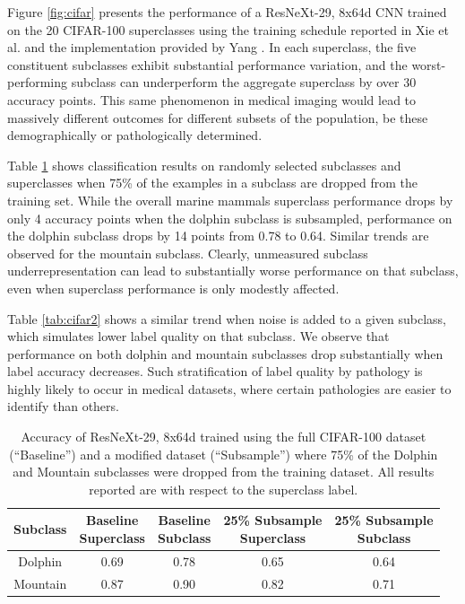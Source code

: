 \documentclass{article}
\begin{document}
 Figure \ref{fig:cifar} presents the performance of a ResNeXt-29, 8x64d CNN trained on the 20 CIFAR-100 superclasses using the training schedule reported in Xie et al. \citep{Xie2016-ip} and the implementation provided by Yang \citep{Yang_undated-bt}.  
In each superclass, the five constituent subclasses exhibit substantial performance variation, and the worst-performing subclass can underperform the aggregate superclass by over 30 accuracy points.  
This same phenomenon in medical imaging would lead to massively different outcomes for different subsets of the population, be these demographically or pathologically determined. 

 Table \ref{tab:cifar1} shows classification results on randomly selected subclasses and superclasses when 75\% of the examples in a subclass are dropped from the training set.  
 While the overall marine mammals superclass performance drops by only 4 accuracy points when the dolphin subclass is subsampled, performance on the dolphin subclass drops by 14 points from 0.78 to 0.64.  
 Similar trends are observed for the mountain subclass.  
 Clearly, unmeasured subclass underrepresentation can lead to substantially worse performance on that subclass, even when superclass performance is only modestly affected.
 
Table \ref{tab:cifar2} shows a similar trend when noise is added to a given subclass, which simulates lower label quality on that subclass.  We observe that performance on both dolphin and mountain subclasses drop substantially when label accuracy decreases.  
Such stratification of label quality by pathology is highly likely to occur in medical datasets, where certain pathologies are easier to identify than others.

\begin{table}[]
\centering
\begin{tabular}{|c|c|c|c|c|}
\hline
 Subclass & \makecell{Baseline \\ Superclass} & \makecell{Baseline \\ Subclass}   &  \makecell{25\% Subsample \\ Superclass}    & \makecell{25\% Subsample \\ Subclass}   \\
 \hline
 Dolphin & 0.69 & 0.78  & 0.65  & 0.64  \\
 Mountain & 0.87 & 0.90  & 0.82 & 0.71  \\
 \hline
\end{tabular}
\caption{Accuracy of ResNeXt-29, 8x64d trained using the full CIFAR-100 dataset (``Baseline'') and a modified dataset (``Subsample'') where 75\% of the Dolphin and Mountain subclasses were dropped from the training dataset.  All results reported are with respect to the superclass label.}
\label{tab:cifar1}
\vspace{-4mm}
\end{table}
\end{document}
